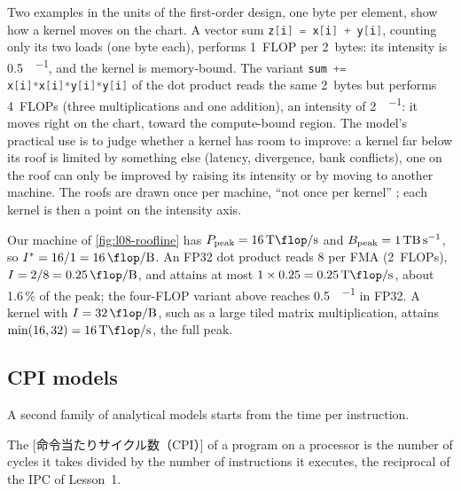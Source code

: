 \documentclass[../main.tex]{subfiles}
\begin{document}
Two examples in the units of the first-order design, one byte per
element, show how a kernel moves on the chart.  A vector sum
\mbox{\lstinline[language=C++]!z[i] = x[i] + y[i]!}, counting only its two
loads (one byte each), performs 1~FLOP per 2~bytes: its intensity is
\SI{0.5}{\flop\per\byte}, and the kernel is memory-bound.  The variant
\mbox{\lstinline[language=C++]!sum += x[i]*x[i]*y[i]*y[i]!} of the
dot product reads the same
2~bytes but performs 4~FLOPs (three multiplications and one addition),
an intensity of \SI{2}{\flop\per\byte}: it moves right on the chart,
toward the compute-bound region.  The model's
practical use is to judge whether a kernel has room to improve: a
kernel far below its roof is limited by something else (latency,
divergence, bank conflicts), one on the roof can only be improved by
raising its intensity or by moving to another machine.  The roofs are
drawn once per machine, \enquote{not once per kernel}
\cite{williams2009roofline}; each kernel is then a point on the
intensity axis.

\begin{example}
  \label{ex:l08-roofline}
  Our machine of \cref{fig:l08-roofline} has
  $P_{\text{peak}} = \SI{16}{\tera\flop\per\second}$ and
  $B_{\text{peak}} = \SI{1}{\tera\byte\per\second}$, so
  $I^{*} = 16/1 = \SI{16}{\flop\per\byte}$.  An FP32 dot product reads
  \SI{8}{\byte} per FMA (2~FLOPs), $I = 2/8 = \SI{0.25}{\flop\per\byte}$, and
  attains at most $1 \times 0.25 = \SI{0.25}{\tera\flop\per\second}$,
  about 1.6\,\% of the peak; the four-FLOP variant above reaches
  \SI{0.5}{\flop\per\byte} in FP32.  A kernel with $I = \SI{32}{\flop\per\byte}$, such
  as a large tiled matrix multiplication, attains
  $\min(16, 32) = \SI{16}{\tera\flop\per\second}$, the full
  peak.
\end{example}

\subsection{CPI models}

A second family of analytical models starts from the time per
instruction.

\begin{definition}[CPI]
  \label{def:l08-cpi}
  The [命令当たりサイクル数（CPI）]
  of a program on a processor is the number of cycles it takes divided
  by the number of instructions it executes, the reciprocal of the IPC
  of Lesson~1.
\end{definition}
\end{document}
